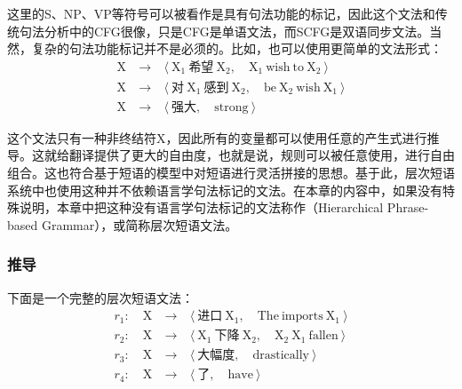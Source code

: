\parinterval 这里的S、NP、VP等符号可以被看作是具有句法功能的标记，因此这个文法和传统句法分析中的CFG很像，只是CFG是单语文法，而SCFG是双语同步文法。当然，复杂的句法功能标记并不是必须的。比如，也可以使用更简单的文法形式：
\begin{eqnarray}
\textrm{X}\ &\to\ &\langle \ \textrm{X}_1\ \text{希望}\ \textrm{X}_2,\quad \textrm{X}_1\ \textrm{wish}\ \textrm{to}\ \textrm{X}_2\ \rangle \nonumber \\
\textrm{X}\ &\to\ &\langle \ \text{对}\ \textrm{X}_1\ \text{感到}\ \textrm{X}_2,\quad \textrm{be}\ \textrm{X}_2\ \textrm{wish}\ \textrm{X}_1\ \rangle \nonumber \\
\textrm{X}\ &\to\ &\langle \ \text{强大},\quad \textrm{strong}\ \rangle \nonumber
\end{eqnarray}

\parinterval 这个文法只有一种非终结符X，因此所有的变量都可以使用任意的产生式进行推导。这就给翻译提供了更大的自由度，也就是说，规则可以被任意使用，进行自由组合。这也符合基于短语的模型中对短语进行灵活拼接的思想。基于此，层次短语系统中也使用这种并不依赖语言学句法标记的文法。在本章的内容中，如果没有特殊说明，本章中把这种没有语言学句法标记的文法称作{\small{}}（Hierarchical Phrase-based Grammar），或简称层次短语文法。


\subsubsection{推导}

\parinterval 下面是一个完整的层次短语文法：
\begin{eqnarray}
r_1:\quad \textrm{X}\ &\to\ &\langle \ \text{进口}\ \textrm{X}_1,\quad \textrm{The}\ \textrm{imports}\ \textrm{X}_1\ \rangle \nonumber \\
r_2:\quad \textrm{X}\ &\to\ &\langle \ \textrm{X}_1\ \text{下降}\ \textrm{X}_2,\quad \textrm{X}_2\ \textrm{X}_1\ \textrm{fallen}\ \rangle \nonumber \\
r_3:\quad \textrm{X}\ &\to\ &\langle \ \text{大幅度},\quad \textrm{drastically}\ \rangle \nonumber \\
r_4:\quad \textrm{X}\ &\to\ &\langle \ \text{了},\quad \textrm{have}\ \rangle \nonumber
\end{eqnarray}

